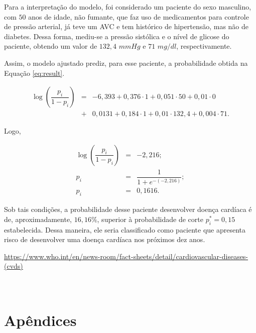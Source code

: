 \documentclass[
  12pt,
]{article}
\begin{document}
\quad Para a interpretação do modelo, foi considerado um paciente do
sexo masculino, com \(50\) anos de idade, não fumante, que faz uso de
medicamentos para controle de pressão arterial, já teve um AVC e tem
histórico de hipertensão, mas não de diabetes. Dessa forma, mediu-se a
pressão sistólica e o nível de glicose do paciente, obtendo um valor de
\(132,4\) \(mmHg\) e \(71\) \(mg/dl\), respectivamente.

\quad Assim, o modelo ajustado prediz, para esse paciente, a
probabilidade obtida na Equação \ref{eq:result}.

\begin{eqnarray}
\log\left(\dfrac{p_i}{1-p_i}\right) &=& -6,393 + 0,376 \cdot 1 + 0,051\cdot 50 + 0,01 \cdot 0\nonumber\\
&+& 0,013 1 + 0,184 \cdot 1 + 0,01 \cdot 132,4 + 0,004 \cdot 71.
\end{eqnarray}

Logo,

\begin{eqnarray}
\label{eq:result}
\log\left(\dfrac{p_i}{1-p_i}\right) &=& -2,216; \nonumber \\
p_i &=& \dfrac{1}{1+e^{-(-2,216)}}; \nonumber \\
p_i &=& 0,1616.
\end{eqnarray}

\quad Sob tais condições, a probabilidade desse paciente desenvolver
doença cardíaca é de, aproximadamente, \(16,16\%\), superior à
probabilidade de corte \(p_i^*=0,15\) estabelecida. Dessa maneira, ele
seria classificado como paciente que apresenta risco de desenvolver uma
doença cardíaca nos próximos dez anos.

\newpage

\begin{thebibliography}{9}
\url{https://www.who.int/en/news-room/fact-sheets/detail/cardiovascular-diseases-(cvds)}\\
\\
 \\
\end{thebibliography}

\newpage
\section{Apêndices}
\end{document}
